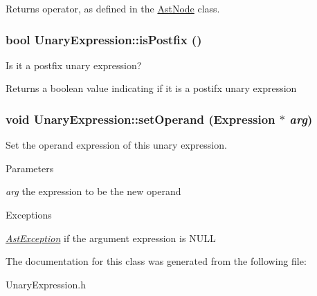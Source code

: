 \begin{DoxyReturn}{Returns}
operator, as defined in the \hyperlink{classAstNode}{AstNode} class. 
\end{DoxyReturn}
\hypertarget{classUnaryExpression_aa7905d7a0bd4197cb72af72c8218194c}{
\subsubsection[{isPostfix}]{\setlength{\rightskip}{0pt plus 5cm}bool UnaryExpression::isPostfix ()}}
\label{classUnaryExpression_aa7905d7a0bd4197cb72af72c8218194c}
Is it a postfix unary expression?

\begin{DoxyReturn}{Returns}
a boolean value indicating if it is a postifx unary expression 
\end{DoxyReturn}
\hypertarget{classUnaryExpression_a6c05bb27e3025ec166041091e4023eaf}{
\subsubsection[{setOperand}]{\setlength{\rightskip}{0pt plus 5cm}void UnaryExpression::setOperand ({\bf Expression} $\ast$ {\em arg})}}
\label{classUnaryExpression_a6c05bb27e3025ec166041091e4023eaf}
Set the operand expression of this unary expression.


\begin{DoxyParams}{Parameters}
\item[{\em arg}]the expression to be the new operand \end{DoxyParams}

\begin{DoxyExceptions}{Exceptions}
\item[{\em \hyperlink{classAstException}{AstException}}]if the argument expression is NULL \end{DoxyExceptions}


The documentation for this class was generated from the following file:\begin{DoxyCompactItemize}
\item 
UnaryExpression.h\end{DoxyCompactItemize}
